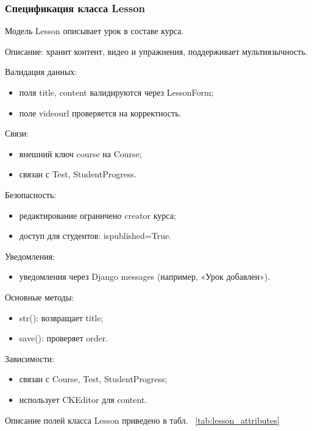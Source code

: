 \subsubsection{Спецификация класса Lesson}

Модель Lesson описывает урок в составе курса.

Описание: хранит контент, видео и упражнения, поддерживает мультиязычность.

Валидация данных:
	\begin{itemize}
		\item поля title, content валидируются через LessonForm;
		\item поле videourl проверяется на корректность.
	\end{itemize}
	
Связи:
	\begin{itemize}
		\item внешний ключ course на Course;
		\item связан с Test, StudentProgress.
	\end{itemize}
	
Безопасность:
	\begin{itemize}
		\item редактирование ограничено creator курса;
		\item доступ для студентов: ispublished=True.
	\end{itemize}
	
Уведомления:
	\begin{itemize}
		\item уведомления через Django messages (например, «Урок добавлен»).
	\end{itemize}
	
Основные методы:
	\begin{itemize}
		\item str(): возвращает title;
		\item save(): проверяет order.
	\end{itemize}
	
Зависимости:
	\begin{itemize}
		\item связан с Course, Test, StudentProgress;
		\item использует CKEditor для content.
	\end{itemize}

Описание полей класса Lesson приведено в табл. ~\ref {tab:lesson_attributes}

